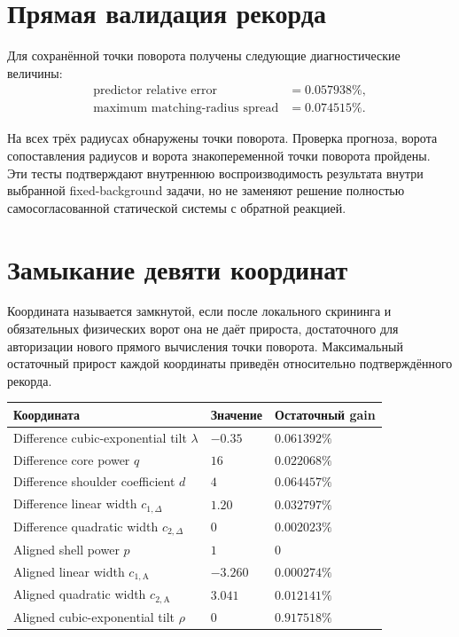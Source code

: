 \documentclass[11pt,a4paper]{article}
\begin{document}
\section{Прямая валидация рекорда}

Для сохранённой точки поворота получены следующие диагностические величины:
\begin{align}
\text{predictor relative error} &= 0.057938\%, \\
\text{maximum matching-radius spread} &= 0.074515\%.
\end{align}

На всех трёх радиусах обнаружены точки поворота. Проверка прогноза, ворота сопоставления радиусов и ворота знакопеременной точки поворота пройдены. Эти тесты подтверждают внутреннюю воспроизводимость результата внутри выбранной fixed-background задачи, но не заменяют решение полностью самосогласованной статической системы с обратной реакцией.

\section{Замыкание девяти координат}

Координата называется замкнутой, если после локального скрининга и обязательных физических ворот она не даёт прироста, достаточного для авторизации нового прямого вычисления точки поворота. Максимальный остаточный прирост каждой координаты приведён относительно подтверждённого рекорда.

\begin{center}
\small
\begin{tabular}{@{}p{}p{}p{}@{}}
\textbf{Координата} & \textbf{Значение} & \textbf{Остаточный gain} \\
\hline
Difference cubic-exponential tilt $\lambda$ & $-0.35$ & $0.061392\%$ \\
Difference core power $q$ & $16$ & $0.022068\%$ \\
Difference shoulder coefficient $d$ & $4$ & $0.064457\%$ \\
Difference linear width $c_{1,\Delta}$ & $1.20$ & $0.032797\%$ \\
Difference quadratic width $c_{2,\Delta}$ & $0$ & $0.002023\%$ \\
Aligned shell power $p$ & $1$ & $0$ \\
Aligned linear width $c_{1,\mathrm{A}}$ & $-3.260$ & $0.000274\%$ \\
Aligned quadratic width $c_{2,\mathrm{A}}$ & $3.041$ & $0.012141\%$ \\
Aligned cubic-exponential tilt $\rho$ & $0$ & $0.917518\%$ \\
\end{tabular}
\end{center}
\end{document}
